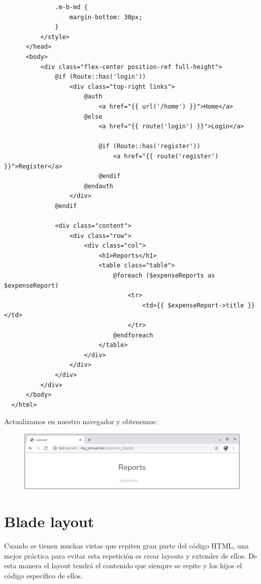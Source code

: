\documentclass{article}
\begin{document}
\begin{verbatim}
              .m-b-md {
                  margin-bottom: 30px;
              }
          </style>
      </head>
      <body>
          <div class="flex-center position-ref full-height">
              @if (Route::has('login'))
                  <div class="top-right links">
                      @auth
                          <a href="{{ url('/home') }}">Home</a>
                      @else
                          <a href="{{ route('login') }}">Login</a>

                          @if (Route::has('register'))
                              <a href="{{ route('register') }}">Register</a>
                          @endif
                      @endauth
                  </div>
              @endif

              <div class="content">
                  <div class="row">
                      <div class="col">
                          <h1>Reports</h1>
                          <table class="table">
                              @foreach ($expenseReports as $expenseReport)
                                  <tr>
                                      <td>{{ $expenseReport->title }}</td>
                                  </tr>
                              @endforeach
                          </table>
                      </div>
                  </div>
              </div>
          </div>
      </body>
  </html>
\end{verbatim}

Actualizamos en nuestro navegador y obtenemos:\\

\begin{figure}[h!]
  \centering
  \includegraphics[scale=0.6]{./Pictures/053_expense_reports_ok.png}
\end{figure}

\newpage



\section{Blade layout}%
Cuando se tienen muchas vistas que repiten gran parte del código HTML, una
mejor práctica para evitar esta repetición es crear layouts y extender de
ellos. De esta manera el layout tendrá el contenido que siempre se repite y los
hijos el código específico de ellos.\\
\end{document}
